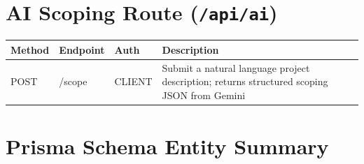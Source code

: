 \section{AI Scoping Route (\texttt{/api/ai})}

\begin{longtable}{|p{2.5cm}|p{4.5cm}|p{2cm}|p{5cm}|}
\hline
\textbf{Method} & \textbf{Endpoint} & \textbf{Auth} & \textbf{Description} \\ \hline
\endhead
POST & /scope & CLIENT & Submit a natural language project description; returns structured scoping JSON from Gemini \\ \hline
\end{longtable}

\section{Prisma Schema Entity Summary}

